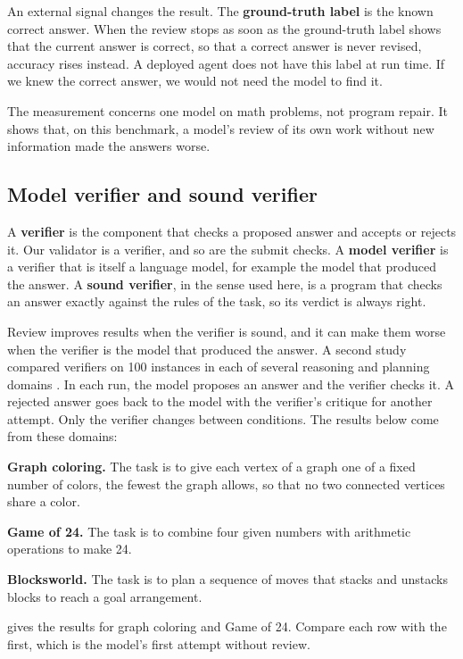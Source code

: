 An external signal changes the result. The \textbf{ground-truth label} is the known correct answer.
When the review stops as soon as the ground-truth label shows that the current answer is correct, so
that a correct answer is never revised, accuracy rises instead. A deployed agent does not have this
label at run time. If we knew the correct answer, we would not need the model to find it.

The measurement concerns one model on math problems, not program repair. It shows that, on this
benchmark, a model's review of its own work without new information made the answers worse.

\subsection{Model verifier and sound verifier}
\label{sec:planning-verifier}

A \textbf{verifier} is the component that checks a proposed answer and accepts or rejects it. Our
validator is a verifier, and so are the submit checks. A \textbf{model verifier} is a verifier that
is itself a language model, for example the model that produced the answer. A \textbf{sound
verifier}, in the sense used here, is a program that checks an answer exactly against the rules of
the task, so its verdict is always right.

Review improves results when the verifier is sound, and it can make them worse when the verifier is
the model that produced the answer. A second study compared verifiers on 100 instances in each of
several reasoning and planning domains \citep[Table~1]{stechly2025selfverification}. In each run, the
model proposes an answer and the verifier checks it. A rejected answer goes back to the model with
the verifier's critique for another attempt. Only the verifier changes between conditions. The
results below come from these domains:
\bi
\item \textbf{Graph coloring.} The task is to give each vertex of a graph one of a fixed number of
colors, the fewest the graph allows, so that no two connected vertices share a color.
\item \textbf{Game of 24.} The task is to combine four given numbers with arithmetic operations to
make 24.
\item \textbf{Blocksworld.} The task is to plan a sequence of moves that stacks and unstacks blocks
to reach a goal arrangement.
\ei

 gives the results for graph coloring and Game of 24. Compare each row
with the first, which is the model's first attempt without review.

